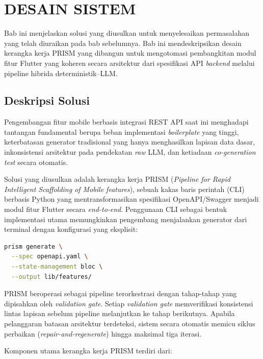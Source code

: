 \chapter{DESAIN SISTEM}

Bab ini menjelaskan solusi yang diusulkan untuk menyelesaikan permasalahan yang telah diuraikan pada bab sebelumnya. Bab ini mendeskripsikan desain kerangka kerja PRISM yang dibangun untuk mengotomasi pembangkitan modul fitur Flutter yang koheren secara arsitektur dari spesifikasi API \textit{backend} melalui pipeline hibrida deterministik--LLM.

\section{Deskripsi Solusi}

Pengembangan fitur mobile berbasis integrasi REST API saat ini menghadapi tantangan fundamental berupa beban implementasi \textit{boilerplate} yang tinggi, keterbatasan generator tradisional yang hanya menghasilkan lapisan data dasar, inkonsistensi arsitektur pada pendekatan \textit{raw} LLM, dan ketiadaan \textit{co-generation test} secara otomatis.

Solusi yang diusulkan adalah kerangka kerja PRISM (\textit{Pipeline for Rapid Intelligent Scaffolding of Mobile features}), sebuah kakas baris perintah (CLI) berbasis Python yang mentransformasikan spesifikasi OpenAPI/Swagger menjadi modul fitur Flutter secara \textit{end-to-end}. Penggunaan CLI sebagai bentuk implementasi utama memungkinkan pengembang menjalankan generator dari terminal dengan konfigurasi yang eksplisit:

\begin{lstlisting}[language=bash]
prism generate \
  --spec openapi.yaml \
  --state-management bloc \
  --output lib/features/
\end{lstlisting}

PRISM beroperasi sebagai pipeline terorkestrasi dengan tahap-tahap yang dipisahkan oleh \textit{validation gate}. Setiap \textit{validation gate} memverifikasi konsistensi lintas lapisan sebelum pipeline melanjutkan ke tahap berikutnya. Apabila pelanggaran batasan arsitektur terdeteksi, sistem secara otomatis memicu siklus perbaikan (\textit{repair-and-regenerate}) hingga maksimal tiga iterasi.

Komponen utama kerangka kerja PRISM terdiri dari:

